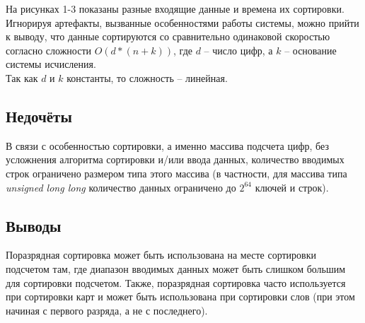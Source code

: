 \documentclass[12pt]{article}
\begin{document}
На рисунках 1-3 показаны разные входящие данные и времена их сортировки.
Игнорируя артефакты, вызванные особенностями работы системы, можно прийти к выводу, что данные сортируются со сравнительно одинаковой скоростью согласно сложности $O(d*(n+k))$, где $d$ -- число цифр, а $k$ -- основание системы исчисления.\\
Так как $d$ и $k$ константы, то сложность -- линейная.
\linebreak

\subsection*{Недочёты}

В связи с особенностью сортировки, а именно массива подсчета цифр, без усложнения алгоритма сортировки и/или ввода данных, количество вводимых строк ограничено размером типа этого массива (в частности, для массива типа \textit{unsigned long long} количество данных ограничено до $2^{64}$ ключей и строк).

\subsection*{Выводы}

Поразрядная сортировка может быть использована на месте сортировки подсчетом там, где диапазон вводимых данных может быть слишком большим для сортировки подсчетом. Также, поразрядная сортировка часто используется при сортировки карт и может быть использована при сортировки слов (при этом начиная с первого разряда, а не с последнего).
\end{document}
